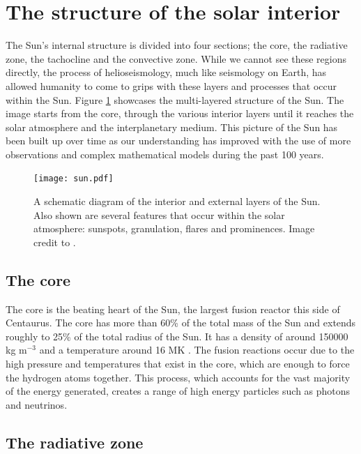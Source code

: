 \section{The structure of the solar interior}

    The Sun's internal structure is divided into four sections; the core, the radiative zone, the tachocline and the convective zone.
    While we cannot see these regions directly, the process of helioseismology, much like seismology on Earth, has allowed humanity to come to grips with these layers and processes that occur within the Sun.
    Figure \ref{fig:Sun} showcases the multi-layered structure of the Sun.
    The image starts from the core, through the various interior layers until it reaches the solar atmosphere and the interplanetary medium.
    This picture of the Sun has been built up over time as our understanding has improved with the use of more observations and complex mathematical models during the past 100 years.
    
    \begin{figure}
        \centering
        \texttt{[image: sun.pdf]}
        \caption{
                A schematic diagram of the interior and external layers of the Sun.
                Also shown are several features that occur within the solar atmosphere: sunspots, granulation, flares and prominences.
                Image credit to \cite{sun_image}.
               }
        \label{fig:Sun}
    \end{figure}

\subsection{The core}

    The core is the beating heart of the Sun, the largest fusion reactor this side of Centaurus.
    The core has more than 60\% of the total mass of the Sun and extends roughly to 25\% of the total radius of the Sun.
    It has a density of around 150000 kg m$^{-3}$ and a temperature around 16 MK \citep{0004-637X-699-2-1403}.
    The fusion reactions occur due to the high pressure and temperatures that exist in the core, which are enough to force the hydrogen atoms together. 
    This process, which accounts for the vast majority of the energy generated, creates a range of high energy particles such as photons and neutrinos.
    
\subsection{The radiative zone}

